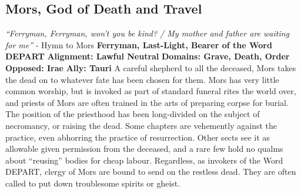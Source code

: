 \subsection{Mors, God of Death and Travel}\label{god:mors}
\textit{“Ferryman, Ferryman, won’t you be kind? / My mother and father are waiting for me”}
\break
\hspace*{\fill} - Hymn to Mors
\break
\break
\textbf{Ferryman, Last-Light, Bearer of the Word DEPART}\break
\hspace*{\fill}\break
\textbf{Alignment:\hspace*{\fill} Lawful Neutral} \break
\textbf{Domains:\hspace*{\fill} Grave, Death, Order} \break
\textbf{Opposed:\hspace*{\fill} Irae} \break
\textbf{Ally:\hspace*{\fill} Tauri} \break
\hspace*{\fill}\break
A careful shepherd to all the deceased, Mors takes the dead on to whatever fate has been chosen for them.\newline
Mors has very little common worship, but is invoked as part of standard funeral rites the world over, and priests of Mors are often trained in the arts of preparing corpse for burial.\newline
The position of the priesthood has been long-divided on the subject of necromancy, or raising the dead. Some chapters are vehemently against the practice, even abhorring the practice of resurrection. Other sects see it as allowable given permission from the deceased, and a rare few hold no qualms about “reusing” bodies for cheap labour.\newline
Regardless, as invokers of the Word DEPART, clergy of Mors are bound to send on the restless dead. They are often called to put down troublesome spirits or gheist.

